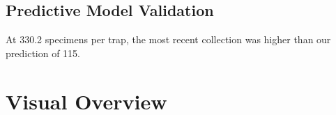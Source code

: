 \documentclass{article}
\begin{document}
\vspace{2mm}
\subsection*{Predictive Model Validation}


\begin{changemargin}{1.5cm}{1.5cm} 

At 330.2 specimens per trap, the most recent collection was higher than our prediction of 115.  

\end{changemargin}

\hrulefill


\fancyhfoffset[E,O]{0pt}


\section*{Visual Overview}
\hrulefill
\end{document}
